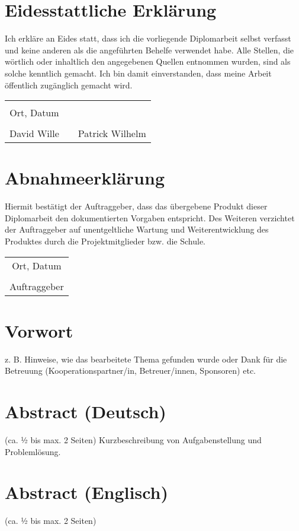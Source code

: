 \chapter*{Eidesstattliche Erklärung}
Ich erkläre an Eides statt, dass ich die vorliegende Diplomarbeit selbst verfasst und keine anderen als die angeführten Behelfe verwendet habe. Alle Stellen, die wörtlich oder inhaltlich den angegebenen Quellen entnommen wurden, sind als solche kenntlich gemacht.
Ich bin damit einverstanden, dass meine Arbeit öffentlich zugänglich gemacht wird.

\vspace{1cm}
\begin{tabular}{c c c}
	& \hspace{4cm} & \\\cline{1-1}
	Ort, Datum & & \\
	\vspace{2cm}
	& & \\\cline{1-1}\cline{3-3}
	David Wille & & Patrick Wilhelm  \\ 
	
\end{tabular}

\chapter*{Abnahmeerklärung}
Hiermit bestätigt der Auftraggeber, dass das übergebene Produkt dieser Diplomarbeit den dokumentierten Vorgaben entspricht. Des Weiteren verzichtet der Auftraggeber auf unentgeltliche Wartung und Weiterentwicklung des Produktes durch die Projektmitglieder bzw. die Schule.

\vspace{1cm}
\begin{tabular}{c}
	\\\cline{1-1}
	Ort, Datum\\
	\vspace{2cm}
	\\\cline{1-1}
	Auftraggeber
\end{tabular}	

\chapter*{Vorwort}
z. B. Hinweise, wie das bearbeitete Thema gefunden wurde oder Dank für die Betreuung (Kooperationspartner/in, Betreuer/innen, Sponsoren) etc.


\chapter*{Abstract (Deutsch)}
(ca. ½ bis max. 2 Seiten)
Kurzbeschreibung von Aufgabenstellung und Problemlösung.

\chapter*{Abstract (Englisch)}
(ca. ½ bis max. 2 Seiten)